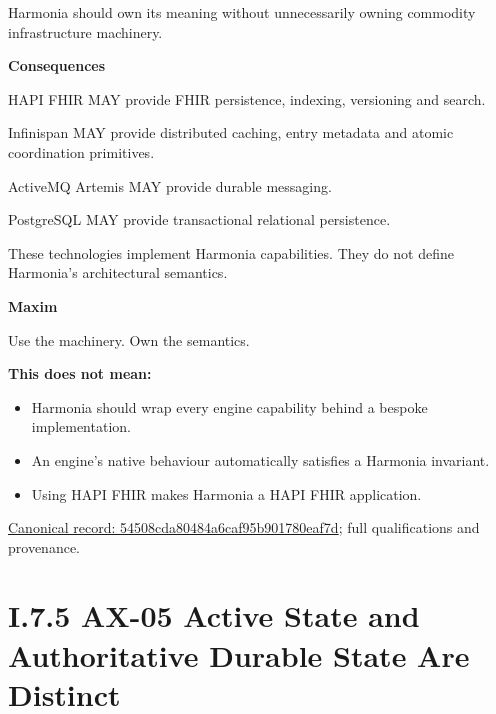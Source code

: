 Harmonia should own its meaning without unnecessarily owning commodity
infrastructure machinery.



\par\medskip\textbf{Consequences}\par


HAPI FHIR MAY provide FHIR persistence, indexing, versioning and search.



Infinispan MAY provide distributed caching, entry metadata and atomic
coordination primitives.



ActiveMQ Artemis MAY provide durable messaging.



PostgreSQL MAY provide transactional relational persistence.



These technologies implement Harmonia capabilities. They do not define
Harmonia's architectural semantics.



\par\medskip\textbf{Maxim}\par


Use the machinery. Own the semantics.



\textbf{This does not mean:}



\begin{itemize}


\item Harmonia should wrap every engine capability behind a bespoke implementation.

\item An engine's native behaviour automatically satisfies a Harmonia invariant.

\item Using HAPI FHIR makes Harmonia a HAPI FHIR application.

\end{itemize}

{\footnotesize \href{../../../../../../../continuum/motivation/principle/54508cda80484a6caf95b901780eaf7d.md}{Canonical record: 54508cda80484a6caf95b901780eaf7d}; full qualifications and provenance.}\par
\section*{I.7.5 AX-05 Active State and Authoritative Durable State Are Distinct}
\label{navigation:I.7.5}

